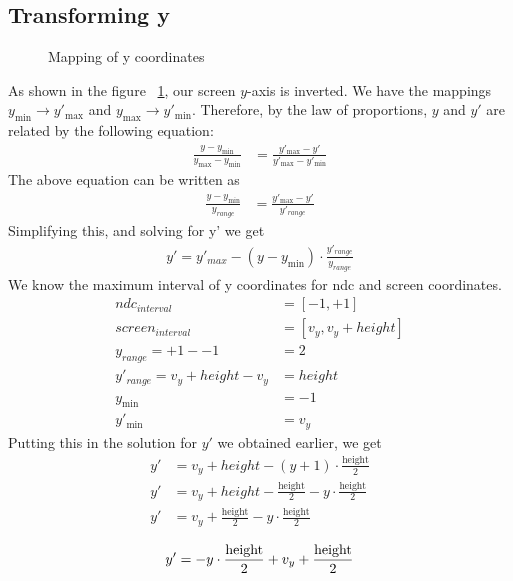 \subsection{Transforming y}
\begin{figure}[h]
\centering
{}
\caption{Mapping of y coordinates}
\label{fig:viewport-xform-y}
\end{figure}
As shown in the figure ~\ref{fig:viewport-xform-y}, our screen $y$-axis is inverted. We have the mappings $y_{\min} \rightarrow y'_{\max}$ and $y_{\max} \rightarrow y'_{\min}$.  
Therefore, by the law of proportions, $y$ and $y'$ are related by the following equation:
\begin{align*}
\frac{y-y_{\min}}{y_{\max}-y_{\min}} &= \frac{y'_{\max}-y'}{y'_{\max}-y'_{\min}}
\end{align*}
The above equation can be written as 
\begin{align*}
\frac{y-y_{\min}}{y_{range}} &= \frac{y'_{\max}-y'}{y'_{range}}
\end{align*}
Simplifying this, and solving for y' we get 
\begin{align*}
y' = y'_{max}-(y-y_{\min})\cdot \frac{y'_{range}}{y_{range}}
\end{align*}
We know the maximum interval of y coordinates for ndc and screen coordinates.
\begin{align*}
ndc_{interval} &= [-1,+1] \\
screen_{interval} &= [v_y,v_y+height] \\
y_{range} = +1 - -1 &= 2 \\
y'_{range} = v_y+height - v_y &=  height \\
y_{\min} &= -1 \\
y'_{\min} &= v_y
\end{align*}
Putting this in the solution for $y'$ we obtained earlier, we get
\begin{align*}
y' &= v_y + height - (y + 1) \cdot \frac{\text{height}}{2} \\
  y' &= v_y + height - \frac{\text{height}}{2} - y \cdot \frac{\text{height}}{2} \\
  y' &= v_y + \frac{\text{height}}{2} - y \cdot \frac{\text{height}}{2} \\
\end{align*}
\begin{equation}
y' = - y \cdot \frac{\text{height}}{2} + v_y + \frac{\text{height}}{2} \\    
\end{equation}
